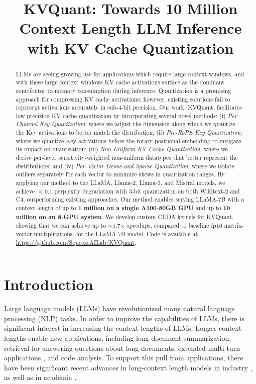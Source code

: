 \title{{KVQuant}: Towards 10 Million Context Length LLM Inference with KV Cache Quantization}

\begin{abstract}
LLMs are seeing growing use for applications which require large context windows, and with these large context windows KV cache activations surface as the dominant contributor to memory consumption during inference. Quantization is a promising approach for compressing KV cache activations; however, existing solutions fail to represent activations accurately in sub-4-bit precision. Our work, {KVQuant}, facilitates low precision KV cache quantization by incorporating several novel methods: (i) \emph{Per-Channel Key Quantization}, where we adjust the dimension along which we quantize the Key activations to better match the distribution; (ii) \emph{Pre-RoPE Key Quantization}, where we quantize Key activations before the rotary positional embedding to mitigate its impact on quantization; (iii) \emph{Non-Uniform KV Cache Quantization}, where we derive per-layer sensitivity-weighted non-uniform datatypes that better represent the distributions; and (iv) \emph{Per-Vector Dense-and-Sparse Quantization}, where we isolate outliers separately for each vector to minimize skews in quantization ranges. By applying our method to the LLaMA, Llama-2, Llama-3, and Mistral models, we achieve $<0.1$ perplexity degradation with 3-bit quantization on both Wikitext-2 and C4, outperforming existing approaches. Our method enables serving LLaMA-7B with a context length of up to \textbf{1 million on a single A100-80GB GPU} and up to \textbf{10 million on an 8-GPU system}. We develop custom CUDA kernels for {KVQuant}, showing that we can achieve up to $\sim$1.7$\times$ speedups, compared to baseline fp16 matrix-vector multiplications, for the LLaMA-7B model. Code is available at \url{https://github.com/SqueezeAILab/KVQuant}.
\end{abstract}

\section{Introduction}

Large language models (LLMs) have revolutionized many natural language processing (NLP) tasks. In order to improve the capabilities of LLMs, there is significant interest in increasing the context lengths of LLMs. Longer context lengths enable new applications, including long document summarization, retrieval for answering questions about long documents, extended multi-turn applications \cite{chen2023longlora}, and code analysis. To support this pull from applications, there have been significant recent advances in long-context length models in industry \cite{anthropic,openai}, as well as in academia \cite{chen2023longlora, liu2024world}. 


